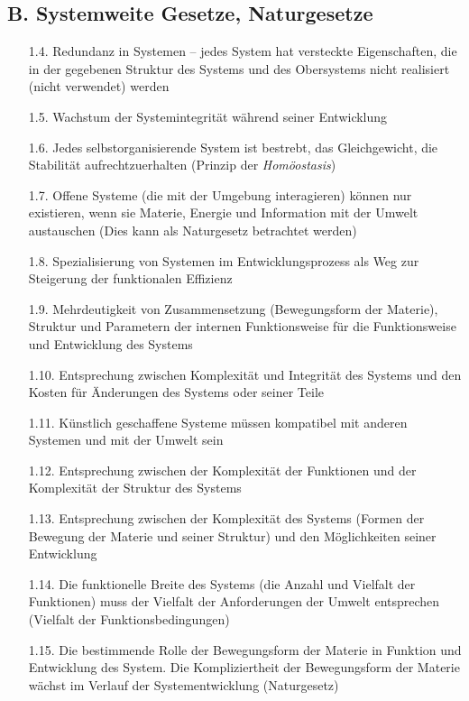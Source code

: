 \documentclass[11pt,a4paper]{article}
\begin{document}
\subsection*{B. Systemweite Gesetze, Naturgesetze}
\begin{itemize}\itemsep0pt
\item[1.4.] Redundanz in Systemen -- jedes System hat versteckte
  Eigenschaften, die in der gegebenen Struktur des Systems und des
  Obersystems nicht realisiert (nicht verwendet) werden
\item[1.5.] Wachstum der Systemintegrität während seiner Entwicklung
\item[1.6.] Jedes selbstorganisierende System ist bestrebt, das Gleichgewicht,
  die Stabilität aufrechtzuerhalten (Prinzip der \emph{Homöostasis})
\item[1.7.] Offene Systeme (die mit der Umgebung interagieren) können nur
  existieren, wenn sie Materie, Energie und Information mit der Umwelt
  austauschen (Dies kann als Naturgesetz betrachtet werden)
\item[1.8.] Spezialisierung von Systemen im Entwicklungsprozess als Weg zur
  Steigerung der funktionalen Effizienz
\item[1.9.] Mehrdeutigkeit von Zusammensetzung (Bewegungsform der Materie),
  Struktur und Parametern der internen Funktionsweise für die Funktionsweise
  und Entwicklung des Systems
\item[1.10.] Entsprechung zwischen Komplexität und Integrität des Systems
  und den Kosten für Änderungen des Systems oder seiner Teile
\item[1.11.] Künstlich geschaffene Systeme müssen kompatibel mit anderen
  Systemen und mit der Umwelt sein
\item[1.12.] Entsprechung zwischen der Komplexität der Funktionen und der
  Komplexität der Struktur des Systems
\item[1.13.] Entsprechung zwischen der Komplexität des Systems (Formen der
  Bewegung der Materie und seiner Struktur) und den Möglichkeiten seiner
  Entwicklung
\item[1.14.] Die funktionelle Breite des Systems (die Anzahl und Vielfalt der
  Funktionen) muss der Vielfalt der Anforderungen der Umwelt entsprechen
  (Vielfalt der Funktionsbedingungen)
\item[1.15.] Die bestimmende Rolle der Bewegungsform der Materie in Funktion
  und Entwicklung des System. Die Kompliziertheit der Bewegungsform der
  Materie wächst im Verlauf der Systementwicklung (Naturgesetz)
\end{itemize}
\end{document}
